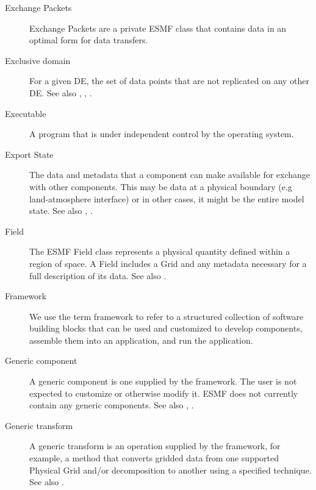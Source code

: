 \begin{description}
\label{glos:EP}
\item[Exchange Packets] Exchange Packets are a private
  ESMF class that contains data in an optimal form for data transfers.

\label{glos:ExcDomain}
\item[Exclusive domain] For a given DE, the 
  set of data points that are not replicated on any other DE.  See also 
  ,
  , .

\label{glos:Exec} 
\item[Executable] 
  A program that is under independent control by the operating 
  system.

\label{glos:ExportState} 
\item[Export State] 
  The data and metadata that 
  a component can make available for exchange with other components. 
  This may be data at a physical boundary (e.g land-atmosphere interface) 
  or in other cases, it might be the entire model state.  
  See also , .

\label{glos:Field} 
\item[Field] The ESMF Field class represents a physical quantity
  defined within a region of space.  A Field includes a Grid 
  and any metadata necessary for a full description of its data.
  See also .

\label{glos:Framework} 
\item[Framework] We use the term framework to 
  refer to a structured collection of software building blocks that can be used 
  and customized to develop components, assemble them into an application, and 
  run the application.

\label{glos:GenericComp} 
\item[Generic component] A generic component
  is one supplied by the framework.  The user is not expected to 
  customize or otherwise modify it.  ESMF does not currently contain any
  generic components.  See also , 
  . 

\label{glos:GenericTrans} 
\item[Generic transform] A generic transform 
  is an operation supplied by the framework, for example, a method 
  that converts gridded data from one supported Physical Grid and/or 
  decomposition to another using a specified technique.  See also .


\end{description}
